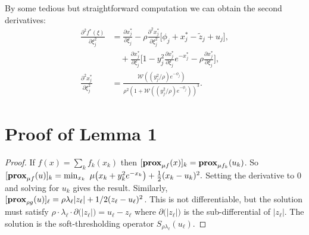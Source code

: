 \documentclass[letterpaper]{article} %
\DeclareMathOperator*{\prox}{\bf prox}
\begin{document}
By some tedious but straightforward computation we can obtain the second derivatives:
\begin{align}
\frac{\partial^2 f^*(\xi)}{\partial \xi_j^2} 
  & =  \frac{\partial
    x_j^*}{\partial \xi_j}
    - \rho \frac{\partial^2
    x_j^*}{\partial
    \xi_j^2} \bigg[ \phi_j
    +x_j^* - \tilde{z}_j +
    u_j \bigg],\\ 
  & \quad + \frac{\partial x_j^*}{\partial \xi_j} \bigg[ 1-y_j^2
    \frac{\partial x_j^*}{\partial \xi_j} e^{-x_j^*} -\rho
    \frac{\partial x_j^*}{\partial \xi_j} \bigg], \label{eq:d2_f*_start}\\
  \frac{\partial^2 x_j^*}{\partial \xi_j^2}  &=
                                               \frac{\mathscr{W}((y_j^2/\rho)
                                               e^{-\phi_j}
                                               )}{\rho^2(1+\mathscr{W}((y_j^2/\rho)
                                               e^{-\phi_j} ))^3} .
\label{eq:d2_x*_start}
\end{align}

\section{Proof of Lemma 1}
\label{sec:proof-lemma-1}

\begin{proof}
  If $f(x)=\sum_k f_k(x_k)$ then $[\prox_{\mu f}(x)]_k =
  \prox_{\mu f_k}(u_k)$. So 
  $[\prox_{\mu f}(u)]_k=\min_{x_k} \,\,
  \mu\big(x_k+y_{k}^2e^{-x_{k}}\big)+\frac{1}{2}  (x_k-u_k)^2.$
  Setting the derivative to 0 and solving for $u_k$ gives the
  result. Similarly, $[\prox_{\rho g}(u)]_\ell=\rho
  \lambda_\ell |z_\ell|+1/2(z_\ell-u_\ell)^2$. This is not differentiable,
  but the solution must satisfy $\rho \cdot \lambda_\ell \cdot \partial
  \big(|z_\ell| \big)=u_\ell-z_\ell$ where $\partial \big(|z_\ell| \big)$ is the
  sub-differential of $|z_\ell|$. The solution is the soft-thresholding
  operator $S_{\rho\lambda_\ell}(u_\ell)$.
\end{proof}


 


\end{document}

